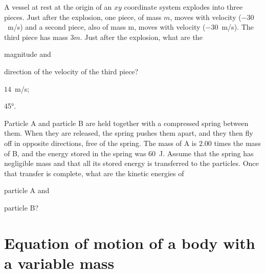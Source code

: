 \begin{problem}
	A vessel at rest at the origin of an $xy$ coordinate system explodes into three pieces. Just after the explosion, one piece, of mass $m$, moves with velocity ($-30$~m/s) and a second piece, also of mass m, moves with velocity ($-30$~m/s). The third piece has mass $3m$. Just after the explosion, what are the 
	\begin{enumerate*}[label=(\alph*)]
		\item magnitude and
		\item direction of the velocity of the third piece?
	\end{enumerate*}
	\begin{solution}
		\begin{enumerate*}[label=(\alph*)]
			\item $14$~m/s;
			\item \ang{45}.
		\end{enumerate*}
	\end{solution}
\end{problem}


\begin{problem}
	Particle A and particle B are held together with a compressed spring between them. When they are released, the spring pushes them apart, and they then fly off in opposite directions, free of the spring. The mass of A is $2.00$ times the mass of B, and the energy stored in the spring was $60$~J. Assume that the spring has negligible mass and that all its stored energy is transferred to the particles. Once that transfer is complete, what are the kinetic energies of 
	\begin{enumerate*}[label=(\alph*)]
		\item particle A and
		\item particle B?
	\end{enumerate*}
\end{problem}

\section{Equation of motion of a body with a variable mass}


